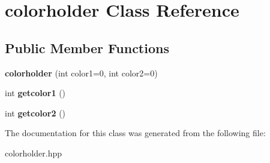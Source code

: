 \hypertarget{classcolorholder}{}\section{colorholder Class Reference}
\label{classcolorholder}
\subsection*{Public Member Functions}
\begin{DoxyCompactItemize}
\item 
\mbox{\label{classcolorholder_a51a5abd7f56d8c917e4860b72c9d4b01}} 
{\bfseries colorholder} (int color1=0, int color2=0)
\item 
\mbox{\label{classcolorholder_a6630ad90e4100b213b98f8e0fe8ebf59}} 
int {\bfseries getcolor1} ()
\item 
\mbox{\label{classcolorholder_a67fd6b9bb75b098f42205bbdd004efb6}} 
int {\bfseries getcolor2} ()
\end{DoxyCompactItemize}


The documentation for this class was generated from the following file\+:\begin{DoxyCompactItemize}
\item 
colorholder.\+hpp\end{DoxyCompactItemize}
